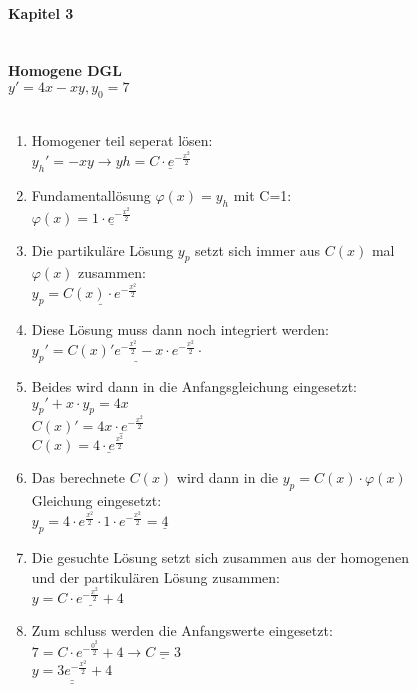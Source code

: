 \begin{figure}[!htb]
\begin{minipage}{0.3\textwidth}
\begin{tiny}
        \paragraph{Kapitel 3}\hfill\\
        \textbf{Homogene DGL}\\
        $y'=4x-xy,y_0=7$\\\\
        \begin{enumerate}
            \item Homogener teil seperat lösen:\\
                $y_h'=-xy\rightarrow yh=\underline{C\cdot e^{-\frac{x^2}{2}}}$
        \item Fundamentallösung $\varphi(x)=y_h$ mit C=1:\\
                $\varphi(x)=\underline{1\cdot e^{-\frac{x^2}{2}}}$
        \item Die partikuläre Lösung $y_p$ setzt sich immer aus $C(x)$ mal $\varphi(x)$ zusammen:\\
                $y_p=\underline{C(x)\cdot e^{-\frac{x^2}{2}}}$
        \item  Diese Lösung muss dann noch integriert werden:\\
                $y_p'=\underline{C(x)'e^{-\frac{x^2}{2}}-x\cdot e^{-\frac{x^2}{2}}\cdot}$
        \item Beides wird dann in die Anfangsgleichung eingesetzt:\\
                $y_p'+x\cdot y_p=4x$ \\
                $C(x)'=\underline{4x\cdot e^{-\frac{x^2}{2}}}$\\
                $C(x)=\underline{4\cdot e^{\frac{x^2}{2}}}$
        \item Das berechnete $C(x)$ wird dann in die $y_p=C(x)\cdot \varphi(x)$ Gleichung eingesetzt:\\
                $y_p=4\cdot e^{\frac{x^2}{2}}\cdot 1\cdot e^{-\frac{x^2}{2}}=\underline{4}$\\
        \item Die gesuchte Lösung setzt sich zusammen aus der homogenen und der partikulären Lösung                   zusammen:\\
                $y=\underline{C\cdot e^{-\frac{x^2}{2}}+4}$
        \item Zum schluss werden die Anfangswerte eingesetzt:\\
        $7=C\cdot e^{-\frac{0^2}{2}}+4 \rightarrow \underline{C=3}$\\
        $\underline{\underline{y=3e^{-\frac{x^2}{2}}+4}}$\\
        \end{enumerate}
        

\end{tiny}
\end{minipage}
\end{figure}

